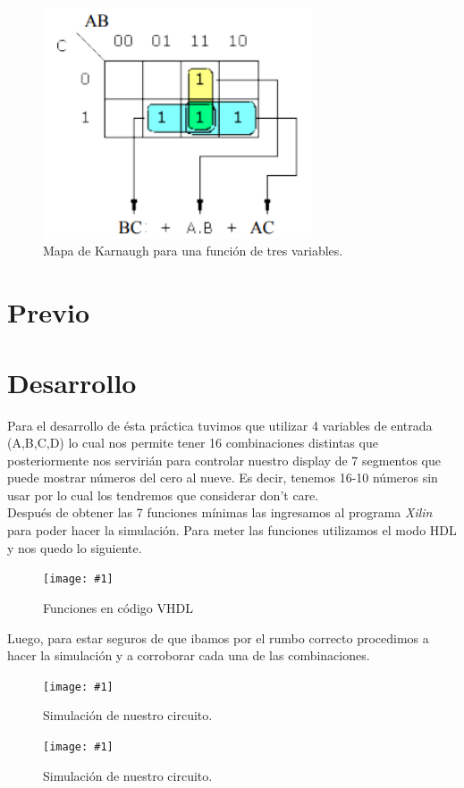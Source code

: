 \documentclass{mylib/reporteConCalif}
\newcommand{\insertImage}[3]{
	\begin{figure}[H]
		\centering
		\texttt{[image: \#1]}
		\caption{#2}
	\end{figure}
}
\begin{document}
\begin{figure}[H]
	\centering
	\includegraphics[width=8cm]{img/labdise_pract5/mapa-kv}
	\caption{Mapa de Karnaugh para una función de tres variables.}
\end{figure}

\newpage
\section{Previo}

\newpage
\section{Desarrollo}

Para el desarrollo de ésta práctica tuvimos que utilizar 4 variables de entrada (A,B,C,D) lo cual nos permite tener 16 combinaciones distintas que posteriormente nos servirián para controlar nuestro display de 7 segmentos que puede mostrar números del cero al nueve. Es decir, tenemos 16-10 números sin usar por lo cual los tendremos que considerar don't care.\\

Después de obtener las 7 funciones mínimas las ingresamos al programa \textit{Xilin} para poder hacer la simulación. Para meter las funciones utilizamos el modo HDL y nos quedo lo siguiente.\\

\insertImage{img/labdise_pract5/image1}{Funciones en código VHDL}{15}

Luego, para estar seguros de que ibamos por el rumbo correcto procedimos a hacer la simulación y a corroborar cada una de las combinaciones. 

\insertImage{img/labdise_pract5/image2}{Simulación de nuestro circuito.}{15}

\insertImage{img/labdise_pract5/image4}{Simulación de nuestro circuito.}{15}
\end{document}
